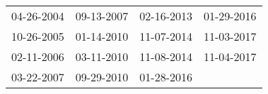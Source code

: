 \begin{supertabular}{llll}
 04-26-2004 &  09-13-2007 &  02-16-2013 &  01-29-2016 \\
 10-26-2005 &  01-14-2010 &  11-07-2014 &  11-03-2017 \\
 02-11-2006 &  03-11-2010 &  11-08-2014 &  11-04-2017 \\
 03-22-2007 &  09-29-2010 &  01-28-2016 &             \\
\end{supertabular}
